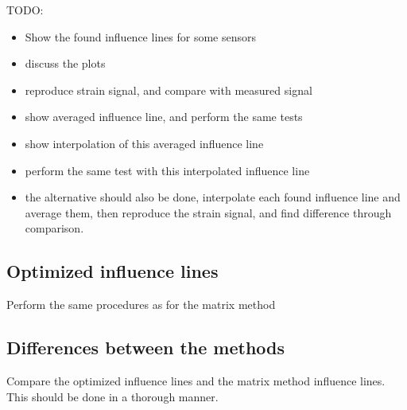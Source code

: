 TODO:
\begin{itemize}
\item Show the found influence lines for some sensors
\item discuss the plots
\item reproduce strain signal, and compare with measured signal
\item show averaged influence line, and perform the same tests
\item show interpolation of this averaged influence line
\item perform the same test with this interpolated influence line
\item the alternative should also be done, interpolate each found influence line and average them, then reproduce the strain signal, and find difference through comparison.
\end{itemize} 

\subsection{Optimized influence lines}
Perform the same procedures as for the matrix method

\subsection{Differences between the methods}
Compare the optimized influence lines and the matrix method influence lines. This should be done in a thorough manner.

